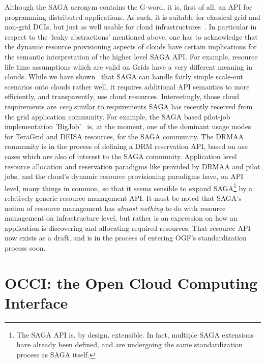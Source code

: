 \documentclass[10pt,conference,final,letterpaper,twoside,twocolumn,]{IEEEtran}
\newcommand{\I}[1]{\textit{#1}}
\begin{document}
  Although the SAGA acronym contains the G-word, it is, first of all,
  an API for programming distributed applications.  As such, it is
  suitable for classical grid and non-grid DCIs, but just as well
  usable for cloud infrastructures~\cite{sagacloud...}.  In particular
  in respect to the 'leaky abstractions' mentioned above, one has to
  acknowledge that the dynamic resource provisioning aspects of clouds
  have certain implications for the semantic interpretation of the
  higher level SAGA API.  For example, resource life time assumptions
  which are valid on Grids have a very different meaning in clouds.
  While we have shown~\cite{sagacloud...} that SAGA can handle fairly
  simple scale-out scenarios onto clouds rather well, it requires
  additional API semantics to more efficiently, and transparently, use
  cloud resources.  Interestingly, those cloud requirements are
  \I{very} similar to requirements SAGA has recently received from the
  grid application community.  For example, the SAGA based pilot-job
  implementation 'BigJob'~\cite{bigjob} is, at the moment, one of the
  dominant usage modes for TeraGrid and DEISA resources, for the SAGA
  community.  The DRMAA community is in the process of defining a DRM
  reservation API, based on use cases which are also of interest to
  the SAGA community.  Application level resource allocation and
  reservation paradigms like provided by DRMAA and pilot jobs, and the
  cloud's dynamic resource provisioning paradigms have, on API level,
  many things in common, so that it seems sensible to expand
  SAGA\footnote{The SAGA API is, by design, extensible.  In fact,
  multiple SAGA extensions have already been defined, and are
  undergoing the same standardization process as SAGA itself.} by a
  relatively generic resource management API.  It must be noted that
  SAGA's notion of resource management has \I{almost nothing} to do
  with resource management on infrastructure level, but rather is an
  expression on how an application is discovering and allocating
  required resources.  That resource API now exists as a draft, and is
  in the process of entering OGF's standardization process soon.
  

\section{OCCI: the Open Cloud Computing Interface}
\label{sec:occi}
\end{document}
